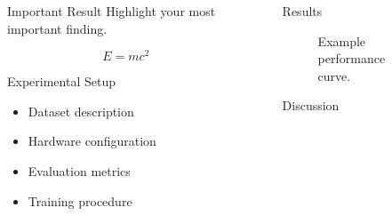 \documentclass[final]{beamer}
\newlength{\sepwidth}
\newlength{\colwidth}
\newcommand{\separatorcolumn}{
  \begin{column}{\sepwidth}
  \end{column}
}
\begin{document}
\begin{frame}[t]
\begin{columns}[t]
\begin{column}{\colwidth}
\begin{alertblock}{Important Result}
Highlight your most important finding.

\[
E = mc^2
\]

\end{alertblock}

\begin{block}{Experimental Setup}

\begin{itemize}
  \item Dataset description
  \item Hardware configuration
  \item Evaluation metrics
  \item Training procedure
\end{itemize}

\end{block}

\end{column}

\separatorcolumn


\begin{column}{\colwidth}

\begin{block}{Results}

\begin{figure}

\centering


\caption{Example performance curve.}

\end{figure}

\end{block}

\begin{block}{Discussion}


\end{block}
\end{column}
\end{columns}
\end{frame}
\end{document}
